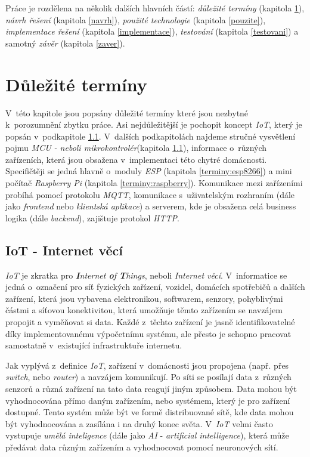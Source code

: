 Práce je rozdělena na několik dalších hlavních částí:
\emph{důležité termíny} (kapitola \ref{terminy}),
\emph{návrh řešení} (kapitola \ref{navrh}),
\emph{použité technologie} (kapitola \ref{pouzite}),
\emph{implementace řešení} (kapitola \ref{implementace}),
\emph{testování} (kapitola \ref{testovani})
a samotný \emph{závěr} (kapitola \ref{zaver}).

\chapter{Důležité termíny}
\label{terminy}

V~této kapitole jsou popsány důležité termíny které jsou nezbytné k~porozumnění zbytku práce.
Asi nejdůležitější je pochopit koncept \emph{IoT}, který je popsán v~podkapitole \ref{terminy:iot}.
V~dalších podkapitolách najdeme stručné vysvětlení pojmu \emph{MCU - neboli mikrokontrolér}(kapitola \ref{terminy:iot}), informace o~různých zařízeních, která jsou obsažena v~implementaci této chytré domácnosti.
Specifičtěji se jedná hlavně o~moduly \emph{ESP} (kapitola \ref{terminy:esp8266}) a mini počítač \emph{Raspberry Pi} (kapitola \ref{terminy:raspberry}).
Komunikace mezi zařízeními probíhá pomocí protokolu \emph{MQTT}, komunikace s~uživatelským rozhraním (dále jako \emph{frontend} nebo \emph{klientská aplikace}) a serverem, kde je obsažena celá business logika (dále \emph{backend}), zajištuje protokol \emph{HTTP}.

\bigskip

\section{IoT - Internet věcí}
\label{terminy:iot}

\emph{IoT} je zkratka pro \emph{\textbf{I}nternet \textbf{o}f \textbf{T}hings}, neboli \emph{Internet věcí}.
V~informatice se jedná o~označení pro síť fyzických zařízení, vozidel, domácích spotřebičů a dalších zařízení, která jsou vybavena elektronikou,
softwarem, senzory, pohyblivými částmi a síťovou konektivitou, která umožňuje těmto zařízením se navzájem propojit a vyměňovat si data.
Každé z~těchto zařízení je jasně identifikovatelné díky implementovanému výpočetnímu systému,
ale přesto je schopno pracovat samostatně v~existující infrastruktuře internetu.~\cite{wiki:iot}

Jak vyplývá z~definice \emph{IoT}, zařízení v~domácnosti jsou propojena (např. přes \emph{switch}, nebo \emph{router}) a navzájem komunikují.
Po síti se posílají data z~různých senzorů a různá zařízení na tato data reagují jiným způsobem.
Data mohou být vyhodnocována přímo daným zařízením, nebo systémem, který je pro zařízení dostupné.
Tento systém může být ve formě distribuované sítě, kde data mohou být vyhodnocována a zasílána i na druhý konec světa.
V~\emph{IoT} velmi často vystupuje \emph{umělá inteligence} (dále jako \emph{AI} - \emph{artificial intelligence}), která může předávat data různým zařízením a vyhodnocovat pomocí neuronových sítí.

